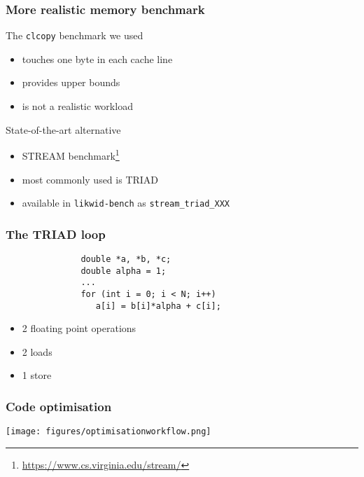 \documentclass[dvipsnames,presentation,aspectratio=169,14pt]{beamer}
\begin{document}
\begin{frame}[fragile]
  \frametitle{More realistic memory benchmark}
  The \texttt{clcopy} benchmark we used
  \begin{itemize}[itemsep=4pt]
  \item {} touches one byte in each cache line
  \item {} provides upper bounds
  \item is not a {realistic} workload
  \end{itemize}

  \vskip 11pt

  State-of-the-art alternative
  \begin{itemize}[itemsep=4pt]
  \item STREAM benchmark\footnote{\url{https://www.cs.virginia.edu/stream/}}
  \item most commonly used is TRIAD
  \item available in \texttt{likwid-bench} as \texttt{stream\_triad\_XXX}
  \end{itemize}
\end{frame}

\begin{frame}[fragile]
  \frametitle{The TRIAD loop}
\begin{verbatim}
               double *a, *b, *c;
               double alpha = 1;
               ...
               for (int i = 0; i < N; i++)
                  a[i] = b[i]*alpha + c[i];
\end{verbatim}
  \vskip 11pt
  \pause
  \begin{itemize}[itemsep=5pt]
  \item 2 floating point operations
  \item 2 loads
  \item 1 store
  \end{itemize}
\end{frame}

\begin{frame}
  \frametitle{Code optimisation}
  \begin{center}
    \texttt{[image: figures/optimisationworkflow.png]}
  \end{center}
\end{frame}
\end{document}
